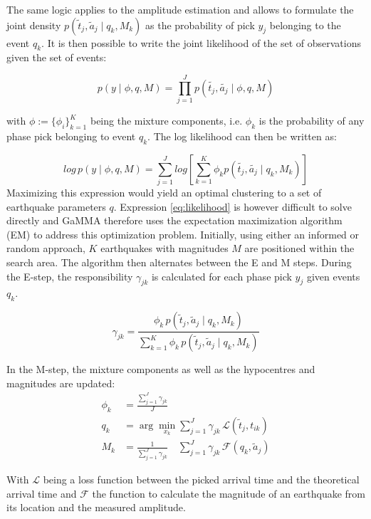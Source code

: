 \documentclass{scrreprt}
\begin{document}
The same logic applies to the amplitude estimation and allows to formulate the joint density $p(\tilde{t}_j, \tilde{a}_j \mid q_k, M_k)$ as the probability of pick $y_j$ belonging to the event $q_k$. It is then possible to write the joint likelihood of the set of observations given the set of events:

\begin{equation}\label{eq:joint}
    p(y \mid \phi, q, M) = \prod_{j=1}^J p(\tilde{t_j}, \tilde{a_j}\mid \phi, q, M)
\end{equation}

with $\phi := \{\phi_i\}^K_{k=1}$ being the mixture components, i.e. $\phi_k$ is the probability of any phase pick belonging to event $q_k$. The log likelihood can then be written as:

\begin{equation}\label{eq:likelihood}
    log\,p(y \mid \phi, q, M) = \sum^J_{j=1}log\left[\sum^K_{k=1} \phi_k p(\tilde{t_j}, \tilde{a_j}\mid q_k, M_k) \right]
\end{equation}
Maximizing this expression would yield an optimal clustering to a set of earthquake parameters $q$. Expression \ref{eq:likelihood} is however difficult to solve directly and
GaMMA therefore uses the expectation maximization algorithm (EM) \citep{dempster} to address this optimization problem. Initially, using either an informed or random approach, $K$ earthquakes with magnitudes $M$ are positioned within the search area. The algorithm then alternates between the E and M steps. During the E-step, the responsibility $\gamma_{jk}$ is calculated for each phase pick $y_j$ given events $q_k$.

\begin{equation}
\gamma_{jk} = \frac{\phi_k\,p(\tilde{t}_j, \tilde{a}_j \mid q_k, M_k)}{\sum^K_{k=1}\phi_k\,p(\tilde{t}_j, \tilde{a}_j \mid q_k, M_k)}
\end{equation}

In the M-step, the mixture components as well as the hypocentres and magnitudes are updated:
\begin{align}
    \phi_k &= \frac{\sum^J_{j=1} \gamma_{jk}}{J} \\
    q_k &= \arg\min_{x_k} \sum^J_{j=1} \gamma_{jk}\,\mathcal{L}(\tilde{t}_j, t_{ik}) \\
    M_k &= \frac{1}{\sum^J_{j=1} \gamma_{jk}} \quad \sum^J_{j=1}\gamma_{jk}\,\mathcal{F}(q_k, \tilde{a}_j)
\end{align}

With $\mathcal{L}$ being a loss function between the picked arrival time and the theoretical arrival time and $\mathcal{F}$ the function to calculate the magnitude of an earthquake from its location and the measured amplitude.
\end{document}
